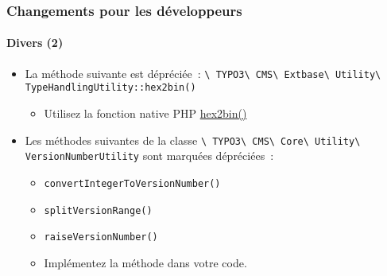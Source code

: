 \begin{frame}[fragile]
	\frametitle{Changements pour les développeurs}
	\framesubtitle{Divers (2)}

	\begin{itemize}

		\item La méthode suivante est dépréciée~:\newline
			\smaller\texttt{\textbackslash
				TYPO3\textbackslash
				CMS\textbackslash
				Extbase\textbackslash
				Utility\textbackslash
				TypeHandlingUtility::hex2bin()}\normalsize

			\begin{itemize}\smaller
				\item[\ding{228}] Utilisez la fonction native PHP \href{https://www.php.net/manual/en/function.hex2bin.php}{hex2bin()}
			\end{itemize}\normalsize

		\item Les méthodes suivantes de la classe
			\smaller\texttt{\textbackslash
				TYPO3\textbackslash
				CMS\textbackslash
				Core\textbackslash
				Utility\textbackslash
				VersionNumberUtility}\normalsize\newline
			sont marquées dépréciées~:

			\begin{itemize}
				\item \texttt{convertIntegerToVersionNumber()}
				\item \texttt{splitVersionRange()}
				\item \texttt{raiseVersionNumber()}
			\end{itemize}

			\begin{itemize}\smaller
				\item[\ding{228}] Implémentez la méthode dans votre code.
			\end{itemize}\normalsize

	\end{itemize}

\end{frame}


